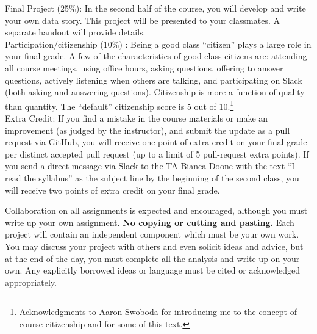 \documentclass[10pt]{article}
\begin{document}
\noindent Final Project (25\%): In the second half of the course, you will develop and write your own data story. This project will be presented to your classmates. A separate handout will provide details. \\

\noindent Participation/citizenship ($10\%$) : Being a good class ``citizen'' plays a large role in your final grade. A few of the characteristics of good class citizens are: attending all course meetings, using office hours, asking questions, offering to answer questions, actively listening when others are talking, and participating on Slack (both asking and answering questions). Citizenship is more a function of quality than quantity. The ``default'' citizenship score is 5 out of 10.\footnote{Acknowledgments to Aaron Swoboda for introducing me to the concept of course citizenship and for some of this text.} \\


\noindent Extra Credit: If you find a mistake in the course materials or make an improvement (as judged by the instructor), and submit the update as a pull request via GitHub, you will receive one point of extra credit on your final grade per distinct accepted pull request (up to a limit of 5 pull-request extra points). If you send a direct message via Slack to the TA Bianca Doone with the text ``I read the syllabus'' as the subject line by the beginning of the second class, you will receive two points of extra credit on your final grade. 




\bigskip
{}

\noindent Collaboration on all assignments is expected and encouraged, although you must write up your own assignment. {\bf No copying or cutting and pasting.} Each project will contain an independent component which must be your own work. You may discuss your project with others and even solicit ideas and advice, but at the end of the day, you must complete all the analysis and write-up on your own. Any explicitly borrowed ideas or language must be cited or acknowledged appropriately.
\end{document}
